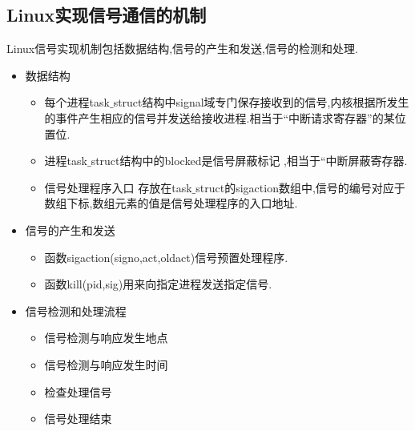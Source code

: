 \documentclass[a4paper,12pt,notitlepage]{article}
\begin{document}
\subsection{Linux实现信号通信的机制}

	Linux信号实现机制包括数据结构,信号的产生和发送,信号的检测和处理. \\
	
\begin{itemize}
	\item 数据结构
	\begin{itemize}
		\item 每个进程task$\_$struct结构中signal域专门保存接收到的信号,内核根据所发生的事件产生相应的信号并发送给接收进程.相当于“中断请求寄存器”的某位置位.
		\item 进程task$\_$struct结构中的blocked是信号屏蔽标记 ,相当于“中断屏蔽寄存器.
		\item 信号处理程序入口 存放在task$\_$struct的sigaction数组中,信号的编号对应于数组下标,数组元素的值是信号处理程序的入口地址.
	\end{itemize}
	\item 信号的产生和发送
	\begin{itemize}
		\item 函数sigaction(signo,act,oldact)信号预置处理程序.
		\item 函数kill(pid,sig)用来向指定进程发送指定信号.
	\end{itemize}
	\item 信号检测和处理流程
	\begin{itemize}
		\item 信号检测与响应发生地点
		\item 信号检测与响应发生时间
		\item 检查处理信号
		\item 信号处理结束
	\end{itemize}
\end{itemize}
\end{document}
